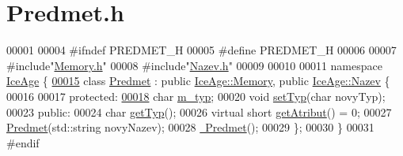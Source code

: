 \hypertarget{Predmet_8h_source}{}\section{Predmet.\+h}
\label{Predmet_8h_source}

\begin{DoxyCode}
00001 
00004 \textcolor{preprocessor}{#ifndef PREDMET\_H}
00005 \textcolor{preprocessor}{#define PREDMET\_H}
00006 
00007 \textcolor{preprocessor}{#include"\hyperlink{Memory_8h}{Memory.h}"}
00008 \textcolor{preprocessor}{#include"\hyperlink{Nazev_8h}{Nazev.h}"}
00009 
00010 
00011 \textcolor{keyword}{namespace }\hyperlink{namespaceIceAge}{IceAge} \{
\hypertarget{Predmet_8h_source.tex_l00015}{}\hyperlink{classIceAge_1_1Predmet}{00015}     \textcolor{keyword}{class }\hyperlink{classIceAge_1_1Predmet}{Predmet} : \textcolor{keyword}{public} \hyperlink{classIceAge_1_1Memory}{IceAge::Memory}, \textcolor{keyword}{public} 
      \hyperlink{classIceAge_1_1Nazev}{IceAge::Nazev} \{
00016 
00017     \textcolor{keyword}{protected}:
\hypertarget{Predmet_8h_source.tex_l00018}{}\hyperlink{classIceAge_1_1Predmet_a3fe2c66d9696c90e46885f41a19fd9af}{00018}         \textcolor{keywordtype}{char} \hyperlink{classIceAge_1_1Predmet_a3fe2c66d9696c90e46885f41a19fd9af}{m\_typ};
00020         \textcolor{keywordtype}{void} \hyperlink{classIceAge_1_1Predmet_af69bf7c4e8cb75493c90deeaa2afd03c}{setTyp}(\textcolor{keywordtype}{char} novyTyp);
00023     \textcolor{keyword}{public}:
00024         \textcolor{keywordtype}{char} \hyperlink{classIceAge_1_1Predmet_a90491592ba559e5b276b672633795e29}{getTyp}();
00026         \textcolor{keyword}{virtual} \textcolor{keywordtype}{short} \hyperlink{classIceAge_1_1Predmet_a43f6c212f4c86e970c3b44eee829a1e1}{getAtribut}() = 0;
00027         \hyperlink{classIceAge_1_1Predmet_a9926e099eb9fa9e7b0e6dbc57c70da8c}{Predmet}(std::string novyNazev);
00028         \hyperlink{classIceAge_1_1Predmet_a5d1df42cff0edd79e2a3990535ae86da}{~Predmet}();
00029     \};
00030 \}
00031 \textcolor{preprocessor}{#endif}
\end{DoxyCode}
